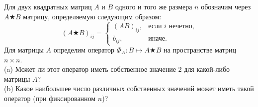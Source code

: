 \documentclass{article}
\begin{document}
Для двух квадратных матриц $A$ и $B$ одного и того же размера $n$ обозначим через $A \bigstar B$ матрицу, определяемую следующим образом:
$$(A \bigstar B)_{ij} = \begin{cases} (AB)_{ij}, & \text{если $i$ нечетно,} \\ b_{ij}, & \text{иначе.} \end{cases}$$
Для матрицы $A$ определим оператор $\Phi_A : B \mapsto A \bigstar B$ на пространстве матриц $n \times n$.\\
(a) Может ли этот оператор иметь собственное значение $2$ для какой-либо матрицы $A$?\\
(b) Какое наибольшее число различных собственных значений может иметь такой оператор (при фиксированном $n$)?
\end{document}

